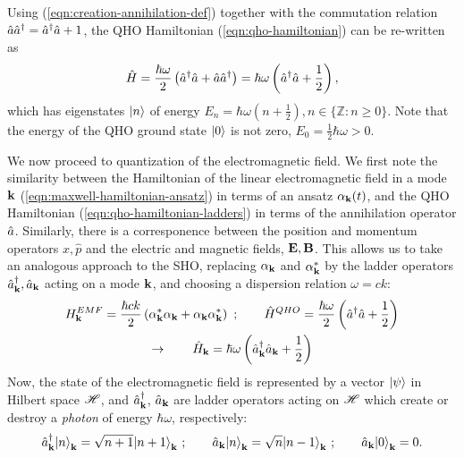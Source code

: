 Using (\ref{eqn:creation-annihilation-def}) together with the commutation relation $\hat{a}\hat{a}^{\dagger} = \hat{a}^{\dagger}\hat{a}+1$, the QHO Hamiltonian (\ref{eqn:qho-hamiltonian}) can be re-written as
\begin{equation}
    \hat{H}= \frac{\hbar \omega}{2} \left( \hat{a}^{\dagger} \hat{a} + \hat{a} \hat{a}^{\dagger} \right) = \hbar \omega \left( \hat{a}^{\dagger} \hat{a} + \frac{1}{2} \right),
    \label{eqn:qho-hamiltonian-ladders}
\end{equation}
which has eigenstates $\mbox{$ | n \rangle $}$ of energy $E_n = \hbar \omega \left(n+\frac{1}{2}\right), n \in \{ \mathbb{Z}: n \ge 0 \}$. Note that the energy of the QHO ground state $\mbox{$ | 0 \rangle $}$ is not zero, $E_0 = \frac{1}{2}\hbar \omega > 0 $. 

We now proceed to quantization of the electromagnetic field. We first note the similarity between the Hamiltonian of the linear electromagnetic field in a mode $\mathbf{k}$ (\ref{eqn:maxwell-hamiltonian-ansatz}) in terms of an ansatz $\alpha_{\mathbf{k}}(t)$, and the QHO Hamiltonian (\ref{eqn:qho-hamiltonian-ladders}) in terms of the annihilation operator $\hat{a}$.  Similarly, there is a corresponence between the position and momentum operators $\hat{x}, \hat{p}$ and the electric and magnetic fields, $\mathbf{E}, \mathbf{B}$. This allows us to take an analogous approach to the SHO, replacing $\alpha_{\mathbf{k}}$ and $\alpha_{\mathbf{k}}^*$ by the ladder operators $\hat{a}^{\dagger}_{\mathbf{k}}, \hat{a}_{\mathbf{k}}$ acting on a mode $\mathbf{k}$, and choosing a dispersion relation $\omega = ck$:
\begin{gather}
   H_{\mathbf{k}}^{EMF} = 
   \frac{\hbar c k}{2} 
   \left( \alpha_{\mathbf{k}}^* \alpha_{\mathbf{k}} + \alpha_{\mathbf{k}} \alpha_{\mathbf{k}}^*\right)
    ~; \qquad
    \hat{H} ^{QHO}= 
    \frac{\hbar \omega}{2} 
    \left( \hat{a}^{\dagger} \hat{a} + \frac{1}{2} \right)
    \\ \rightarrow \qquad
    \hat{H}_{\mathbf{k}} = \hbar \omega \left( \hat{a}^{\dagger}_{\mathbf{k}} \hat{a}_{\mathbf{k}} + \frac{1}{2} \right)
    \label{eqn:quantized-electromagnetic-hamiltonian}
\end{gather}
Now, the state of the electromagnetic field is represented by a vector $\mbox{$ | \psi \rangle $}$ in Hilbert space $\mathscr{H}$, and $\hat{a}^{\dagger}_{\mathbf{k}}$, $\hat{a}_{\mathbf{k}}$ are ladder operators acting on $\mathscr{H}$ which create or destroy a \emph{photon} of energy $\hbar \omega$, respectively:
\begin{equation}
   \hat{a}^{\dagger}_{\mathbf{k}} \mbox{$ | n \rangle $}_{\mathbf{k}} = \sqrt{n+1} \mbox{$ | n+1 \rangle $}_{\mathbf{k}} ~; \qquad
   \hat{a}_{\mathbf{k}} \mbox{$ | n \rangle $}_{\mathbf{k}} = \sqrt{n} \mbox{$ | n-1 \rangle $}_{\mathbf{k}} ~; \qquad
   \hat{a}_{\mathbf{k}} \mbox{$ | 0 \rangle $}_{\mathbf{k}} = 0.
\end{equation}
